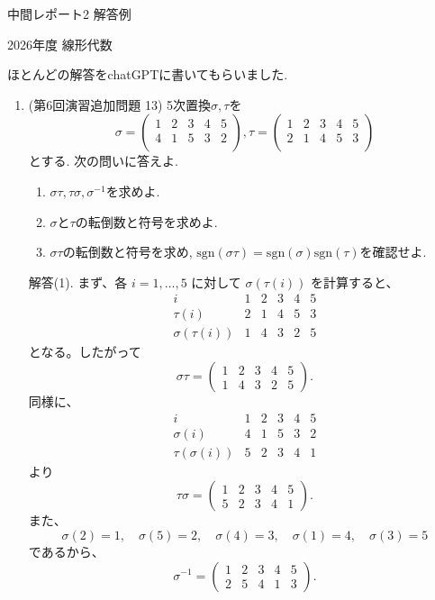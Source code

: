 \documentclass[dvipdfmx,a4paper,11pt]{article} %
\theoremstyle{definition}
\begin{document}
\newpage
\begin{center}
{\Large 中間レポート2 解答例}\par
\vspace{0.5em}
{\small 2026年度 線形代数}
\end{center}
ほとんどの解答をchatGPTに書いてもらいました.


\begin{enumerate}[label=\textbf{問題}\arabic*.]

\item (第6回演習追加問題 13) 5次置換$ \sigma, \tau$を
 $$
 \sigma
 =
\begin{pmatrix}
1& 2& 3 & 4  & 5 \\
4& 1& 5& 3& 2 \\
\end{pmatrix}
, 
\tau 
 =
\begin{pmatrix}
1& 2& 3 & 4  & 5 \\
2& 1& 4& 5& 3 \\
\end{pmatrix}
$$
とする. 
次の問いに答えよ.
 \begin{enumerate}[label=(\arabic*)]
\item $\sigma \tau, \tau \sigma, \sigma^{-1}$を求めよ.
\item $\sigma$と$\tau$の転倒数と符号を求めよ. 
\item $\sigma \tau$の転倒数と符号を求め, $\mathrm{sgn}(\sigma \tau)=\mathrm{sgn}(\sigma) \mathrm{sgn}(\tau)$を確認せよ. 
\end{enumerate}

解答(1).
まず、各 $i=1,\ldots,5$ に対して $\sigma(\tau(i))$ を計算すると、
\[
\begin{array}{c|ccccc}
i&1&2&3&4&5\\ \hline
\tau(i)&2&1&4&5&3\\
\sigma(\tau(i))&1&4&3&2&5
\end{array}
\]
となる。したがって
\[
\sigma\tau=
\begin{pmatrix}
1&2&3&4&5\\
1&4&3&2&5
\end{pmatrix}.
\]
同様に、
\[
\begin{array}{c|ccccc}
i&1&2&3&4&5\\ \hline
\sigma(i)&4&1&5&3&2\\
\tau(\sigma(i))&5&2&3&4&1
\end{array}
\]
より
\[
\tau\sigma=
\begin{pmatrix}
1&2&3&4&5\\
5&2&3&4&1
\end{pmatrix}.
\]
また、
\[
\sigma(2)=1,\quad
\sigma(5)=2,\quad
\sigma(4)=3,\quad
\sigma(1)=4,\quad
\sigma(3)=5
\]
であるから、
\[
\sigma^{-1}=
\begin{pmatrix}
1&2&3&4&5\\
2&5&4&1&3
\end{pmatrix}.
\]


\end{enumerate}
\end{document}
